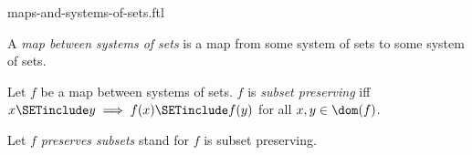 \documentclass{naproche-library}
\begin{document}
\begin{smodule}[title=Maps and Systems of Sets]{maps-and-systems-of-sets.ftl}

\begin{definition}[forthel,id=FOUNDATIONS_10_1394550966845440]
  A \emph{map between systems of sets} is a map from some system of sets to some system of sets.
\end{definition}

\begin{definition}[forthel,id=FOUNDATIONS_10_3290499861446656]
  Let $f$ be a map between systems of sets.
  $f$ is \emph{subset preserving} iff $x \SETinclude y \implies f(x) \SETinclude f(y)$ for all $x, y \in \dom(f)$.

  Let $f$ \emph{preserves subsets} stand for $f$ is subset preserving.
\end{definition}
\end{smodule}
\end{document}
